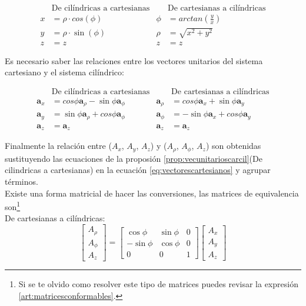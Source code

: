 \documentclass[11pt,fleqn]{book} %
\begin{document}
\begin{proposition}
\begin{align*}
&\text{De cilíndricas a cartesianas}   &&  \text{De cartesianas a cilíndricas}  \\
    x&=\rho\cdot cos(\phi)   &  \phi&=arctan\left(\frac{y}{x}\right) \\
    y&=\rho\cdot \sin(\phi) & \rho&=\sqrt{x^2+y^2}\\
    z&=z & z&=z
\end{align*}
\end{proposition}
Es necesario saber las relaciones entre los vectores unitarios del sistema cartesiano y el sistema cilíndrico:
\begin{proposition}\label{prop:vecunitarioscarcil}
\begin{align*}
&\text{De cilíndricas a cartesianas}   &&  \text{De cartesianas a cilíndricas}  \\
    \textbf{a}_x&=cos\phi \textbf{a}_{\rho} - \sin\phi \textbf{a}_{\phi}   &  \textbf{a}_{\rho}&=cos\phi \textbf{a}_x + \sin\phi \textbf{a}_y \\
    \textbf{a}_y&=\sin\phi \textbf{a}_{\rho} + cos\phi \textbf{a}_{\phi} & \textbf{a}_{\phi}&=-\sin\phi \textbf{a}_x + cos\phi \textbf{a}_y\\
    \textbf{a}_z&=\textbf{a}_z & \textbf{a}_z&=\textbf{a}_z
\end{align*}
\end{proposition}
Finalmente la relación entre ($A_x$, $A_y$, $A_z$) y ($A_{\rho}$, $A_{\phi}$, $A_z$) son obtenidas sustituyendo las ecuaciones de la proposión \ref{prop:vecunitarioscarcil}(De cilindricas a cartesianas) en la ecuación \ref{eq:vectorescartesianos} y agrupar términos.\\
Existe una forma matricial de hacer las conversiones, las matrices de equivalencia son\footnote{Si se te olvido como resolver este tipo de matrices puedes revisar la expresión \ref{art:matricesconformables}.}\\
De cartesianas a cilíndricas:
\begin{equation}
\begin{bmatrix}A_{\rho}\\A_{\phi}\\A_z
\end{bmatrix}=
   \begin{bmatrix}
     \cos\phi & \sin\phi & 0\\
     -\sin\phi & \cos\phi & 0\\
     0 & 0 & 1
   \end{bmatrix}
   \begin{bmatrix}A_x \\A_y\\A_z \end{bmatrix}
\end{equation}
\end{document}
